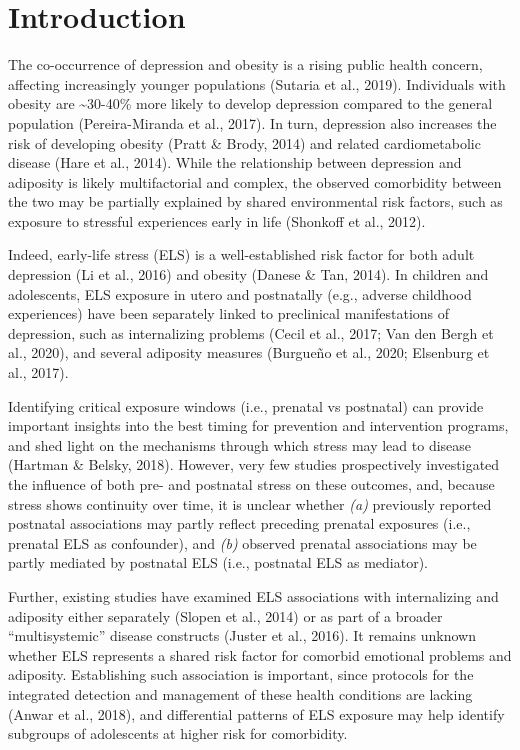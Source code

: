 \documentclass[
  letterpaper,
  DIV=11,
  numbers=noendperiod]{scrreport}
\begin{document}
\newpage

\section{Introduction}\label{introduction}

The co-occurrence of depression and obesity is a rising public health
concern, affecting increasingly younger populations (Sutaria et al.,
2019). Individuals with obesity are \textasciitilde30-40\% more likely
to develop depression compared to the general population
(Pereira-Miranda et al., 2017). In turn, depression also increases the
risk of developing obesity (Pratt \& Brody, 2014) and related
cardiometabolic disease (Hare et al., 2014). While the relationship
between depression and adiposity is likely multifactorial and complex,
the observed comorbidity between the two may be partially explained by
shared environmental risk factors, such as exposure to stressful
experiences early in life (Shonkoff et al., 2012).

Indeed, early-life stress (ELS) is a well-established risk factor for
both adult depression (Li et al., 2016) and obesity (Danese \& Tan,
2014). In children and adolescents, ELS exposure in utero and
postnatally (e.g., adverse childhood experiences) have been separately
linked to preclinical manifestations of depression, such as
internalizing problems (Cecil et al., 2017; Van den Bergh et al., 2020),
and several adiposity measures (Burgueño et al., 2020; Elsenburg et al.,
2017).

Identifying critical exposure windows (i.e., prenatal vs postnatal) can
provide important insights into the best timing for prevention and
intervention programs, and shed light on the mechanisms through which
stress may lead to disease (Hartman \& Belsky, 2018). However, very few
studies prospectively investigated the influence of both pre- and
postnatal stress on these outcomes, and, because stress shows continuity
over time, it is unclear whether \emph{(a)} previously reported
postnatal associations may partly reflect preceding prenatal exposures
(i.e., prenatal ELS as confounder), and \emph{(b)} observed prenatal
associations may be partly mediated by postnatal ELS (i.e., postnatal
ELS as mediator).

Further, existing studies have examined ELS associations with
internalizing and adiposity either separately (Slopen et al., 2014) or
as part of a broader ``multisystemic'' disease constructs (Juster et
al., 2016). It remains unknown whether ELS represents a shared risk
factor for comorbid emotional problems and adiposity. Establishing such
association is important, since protocols for the integrated detection
and management of these health conditions are lacking (Anwar et al.,
2018), and differential patterns of ELS exposure may help identify
subgroups of adolescents at higher risk for comorbidity.
\end{document}
